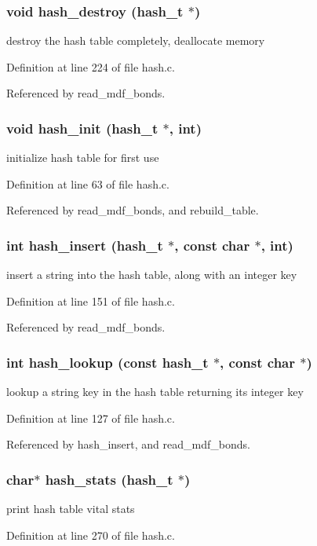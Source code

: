 \subsubsection{\setlength{\rightskip}{0pt plus 5cm}void hash\_\-destroy ({\bf hash\_\-t} $\ast$)}\label{hash_8h_a7}


destroy the hash table completely, deallocate memory 

Definition at line 224 of file hash.c.

Referenced by read\_\-mdf\_\-bonds.
\subsubsection{\setlength{\rightskip}{0pt plus 5cm}void hash\_\-init ({\bf hash\_\-t} $\ast$, int)}\label{hash_8h_a3}


initialize hash table for first use 

Definition at line 63 of file hash.c.

Referenced by read\_\-mdf\_\-bonds, and rebuild\_\-table.
\subsubsection{\setlength{\rightskip}{0pt plus 5cm}int hash\_\-insert ({\bf hash\_\-t} $\ast$, const char $\ast$, int)}\label{hash_8h_a5}


insert a string into the hash table, along with an integer key 

Definition at line 151 of file hash.c.

Referenced by read\_\-mdf\_\-bonds.
\subsubsection{\setlength{\rightskip}{0pt plus 5cm}int hash\_\-lookup (const {\bf hash\_\-t} $\ast$, const char $\ast$)}\label{hash_8h_a4}


lookup a string key in the hash table returning its integer key 

Definition at line 127 of file hash.c.

Referenced by hash\_\-insert, and read\_\-mdf\_\-bonds.
\subsubsection{\setlength{\rightskip}{0pt plus 5cm}char$\ast$ hash\_\-stats ({\bf hash\_\-t} $\ast$)}\label{hash_8h_a8}


print hash table vital stats 

Definition at line 270 of file hash.c.